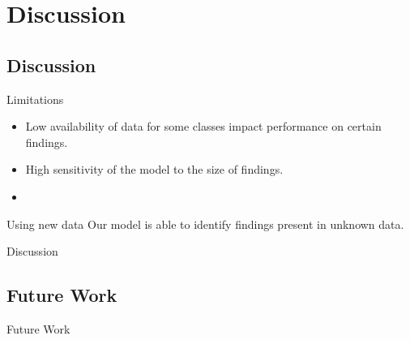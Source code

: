 \section{Discussion}
\subsection{Discussion}
\begin{frame}{Limitations}
    \begin{itemize}
        \item Low availability of data for some classes impact performance on certain findings.
        \item High sensitivity of the model to the size of findings.
        \item 
    \end{itemize}
\end{frame}

\begin{frame}{Using new data}
    Our model is able to identify findings present in unknown data.
\end{frame}

\begin{frame}{Discussion}
    
\end{frame}

\subsection{Future Work}
\begin{frame}{Future Work}
    
\end{frame}
